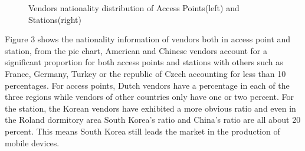 \newpage
\begin{figure}[H]
    \centering
    \quad   
    \quad

    \caption{Vendors nationality distribution of Access Points(left) and Stations(right)}
    \label{fig.3}
\end{figure}

Figure 3 shows the nationality information of vendors both in access point and station, from the pie chart, American and Chinese vendors account for a significant proportion for both access points and stations with others such as France, Germany, Turkey or the republic of Czech accounting for less than 10 percentages. For access points, Dutch vendors have a percentage in each of the three regions while vendors of other countries only have one or two percent. For the station, the Korean vendors have exhibited a more obvious ratio and even in the Roland dormitory area South Korea's ratio and China's ratio are all about 20 percent. This means South Korea still leads the market in the production of mobile devices.